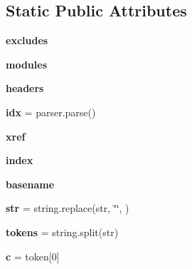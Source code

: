 \subsection*{Static Public Attributes}
\begin{DoxyCompactItemize}
\item 
\mbox{\label{classapibuild_1_1doc_builder_a6e7db0584738b199f8d679f55a36c371}} 
{\bfseries excludes}
\item 
\mbox{\label{classapibuild_1_1doc_builder_a9b353d0b058523ad8d186474db4995d0}} 
{\bfseries modules}
\item 
\mbox{\label{classapibuild_1_1doc_builder_af659975aede86ecd6efc855a0b18e38c}} 
{\bfseries headers}
\item 
\mbox{\label{classapibuild_1_1doc_builder_ad44d7ca849e686d42695fb39277d0734}} 
{\bfseries idx} = parser.\+parse()
\item 
\mbox{\label{classapibuild_1_1doc_builder_a0301c87853213219f994af21842adcbf}} 
{\bfseries xref}
\item 
\mbox{\label{classapibuild_1_1doc_builder_ae55cf64a1bc4331296fa33f74b741459}} 
{\bfseries index}
\item 
\mbox{\label{classapibuild_1_1doc_builder_a87dda10b38b30a583deaf31c3afc3a7e}} 
{\bfseries basename}
\item 
\mbox{\label{classapibuild_1_1doc_builder_aa2092b23563f2aabef23b04e60206fac}} 
{\bfseries str} = string.\+replace(str, \char`\"{}\textquotesingle{}\char`\"{}, \textquotesingle{} \textquotesingle{})
\item 
\mbox{\label{classapibuild_1_1doc_builder_a31366a966e6c251d23c3ac8e7026fe66}} 
{\bfseries tokens} = string.\+split(str)
\item 
\mbox{\label{classapibuild_1_1doc_builder_ae4c2c1388fb2f129049b45f03450a3d5}} 
{\bfseries c} = token\mbox{[}0\mbox{]}

\end{DoxyCompactItemize}
